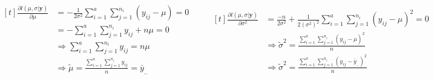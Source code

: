 \documentclass[17pt]{extarticle}
\begin{document}
\begin{equation*}
\begin{aligned}[t]
\frac{\partial l(\mu, \sigma|\mathbf{y})}{\partial  \mu} & = -\frac{1}      {2\sigma^{2}}\sum_{i=1}^{a}\sum_{j=1}^{n_{i}}(y_{ij}-\mu)=0 \\
 & = -\sum_{i=1}^{a}\sum_{j=1}^{n_{i}}y_{ij}+n\mu=0\\
 & \Rightarrow \sum_{i=1}^{a}\sum_{j=1}^{n_{i}}y_{ij}=n\mu\\
 & \Rightarrow     \tilde{\mu}=\frac{\sum_{i=1}^{a}\sum_{j=1}^{n_{i}}y_{ij}}{n}=\bar{y}_{..} \\
\end{aligned}
\qquad 
\begin{aligned}[t]
\frac{\partial l(\mu, \sigma|\mathbf{y})}{\partial  \sigma^{2}} &     =\frac{-n}{2\sigma^{2}}+\frac{1}   {2(\sigma^{2})^{2}}\sum_{i=1}^{a}\sum_{j=1}^{n_{i}}(y_{ij}-\mu)^{2}=0 \\ 
& \Rightarrow    \tilde{\sigma}^{2}=\frac{\sum_{i=1}^{a}\sum_{j=1}^{n_{i}}(y_{ij}-\mu)^{2}}{n}  \\ 
& \Rightarrow   \tilde{\sigma}^{2}=\frac{\sum_{i=1}^{a}\sum_{j=1}^{n_{i}}(y_{ij}-  \bar{y}_{..})^{2}}{n}
\end{aligned}
\end{equation*}
\end{document}
